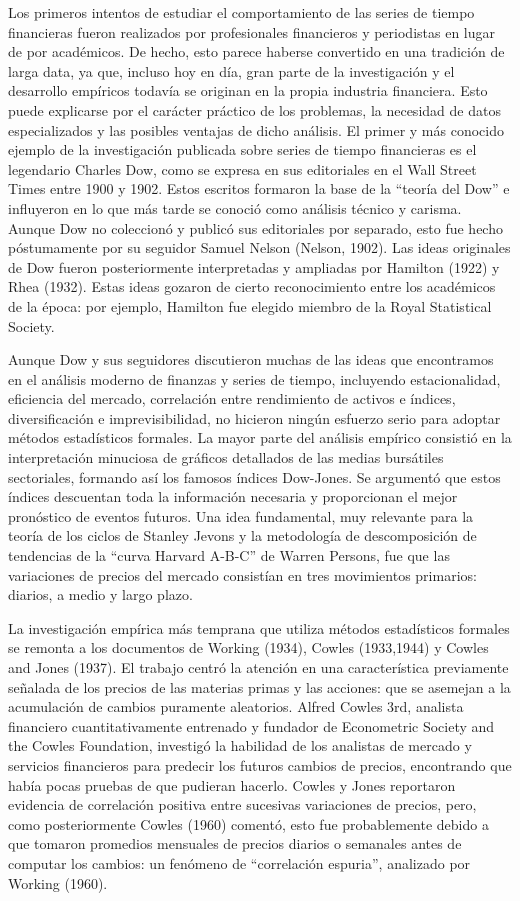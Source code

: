 \documentclass[12pt,]{krantz}
\theoremstyle{definition}
\theoremstyle{definition}
\theoremstyle{definition}
\theoremstyle{remark}
\begin{document}
Los primeros intentos de estudiar el comportamiento de las series de
tiempo financieras fueron realizados por profesionales financieros y
periodistas en lugar de por académicos. De hecho, esto parece haberse
convertido en una tradición de larga data, ya que, incluso hoy en día,
gran parte de la investigación y el desarrollo empíricos todavía se
originan en la propia industria financiera. Esto puede explicarse por el
carácter práctico de los problemas, la necesidad de datos especializados
y las posibles ventajas de dicho análisis. El primer y más conocido
ejemplo de la investigación publicada sobre series de tiempo financieras
es el legendario Charles Dow, como se expresa en sus editoriales en el
Wall Street Times entre 1900 y 1902. Estos escritos formaron la base de
la ``teoría del Dow'' e influyeron en lo que más tarde se conoció como
análisis técnico y carisma. Aunque Dow no coleccionó y publicó sus
editoriales por separado, esto fue hecho póstumamente por su seguidor
Samuel Nelson (Nelson, 1902). Las ideas originales de Dow fueron
posteriormente interpretadas y ampliadas por Hamilton (1922) y Rhea
(1932). Estas ideas gozaron de cierto reconocimiento entre los
académicos de la época: por ejemplo, Hamilton fue elegido miembro de la
Royal Statistical Society.

Aunque Dow y sus seguidores discutieron muchas de las ideas que
encontramos en el análisis moderno de finanzas y series de tiempo,
incluyendo estacionalidad, eficiencia del mercado, correlación entre
rendimiento de activos e índices, diversificación e imprevisibilidad, no
hicieron ningún esfuerzo serio para adoptar métodos estadísticos
formales. La mayor parte del análisis empírico consistió en la
interpretación minuciosa de gráficos detallados de las medias bursátiles
sectoriales, formando así los famosos índices Dow-Jones. Se argumentó
que estos índices descuentan toda la información necesaria y
proporcionan el mejor pronóstico de eventos futuros. Una idea
fundamental, muy relevante para la teoría de los ciclos de Stanley
Jevons y la metodología de descomposición de tendencias de la ``curva
Harvard A-B-C'' de Warren Persons, fue que las variaciones de precios
del mercado consistían en tres movimientos primarios: diarios, a medio y
largo plazo.

La investigación empírica más temprana que utiliza métodos estadísticos
formales se remonta a los documentos de Working (1934), Cowles
(1933,1944) y Cowles and Jones (1937). El trabajo centró la atención en
una característica previamente señalada de los precios de las materias
primas y las acciones: que se asemejan a la acumulación de cambios
puramente aleatorios. Alfred Cowles 3rd, analista financiero
cuantitativamente entrenado y fundador de Econometric Society and the
Cowles Foundation, investigó la habilidad de los analistas de mercado y
servicios financieros para predecir los futuros cambios de precios,
encontrando que había pocas pruebas de que pudieran hacerlo. Cowles y
Jones reportaron evidencia de correlación positiva entre sucesivas
variaciones de precios, pero, como posteriormente Cowles (1960) comentó,
esto fue probablemente debido a que tomaron promedios mensuales de
precios diarios o semanales antes de computar los cambios: un fenómeno
de ``correlación espuria'', analizado por Working (1960).
\end{document}
